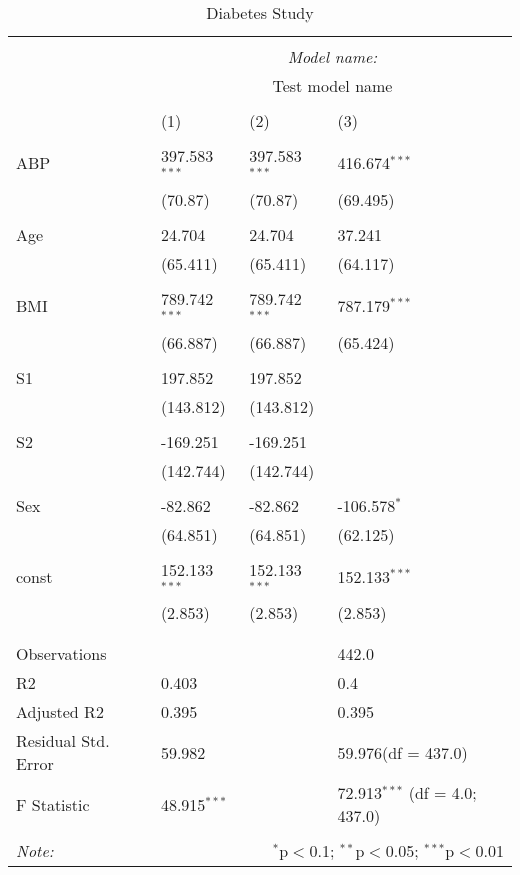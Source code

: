\documentclass[12pt]{article}
\numberwithin{equation}{subsection}
\begin{document}
\begin{table}[!htbp] \centering
  \caption{Diabetes Study}
  \label{}
\begin{tabularx}{\textwidth}{lXXX}
\\[-1.8ex]\hline
\hline \\[-1.8ex]
& \multicolumn{3}{c}{\textit{Model name:}} \
\cr \cline{3-4}
\\[-1.8ex] & \multicolumn{3}{c}{Test model name} \\\\[-1.8ex] & (1) & (2) & (3) \\
\hline \\[-1.8ex]
 ABP & 397.583$^{***}$ & 397.583$^{***}$ & 416.674$^{***}$ \\
  & (70.87) & (70.87) & (69.495) \\
  & & & \\
 Age & 24.704$^{}$ & 24.704$^{}$ & 37.241$^{}$ \\
  & (65.411) & (65.411) & (64.117) \\
  & & & \\
 BMI & 789.742$^{***}$ & 789.742$^{***}$ & 787.179$^{***}$ \\
  & (66.887) & (66.887) & (65.424) \\
  & & & \\
 S1 & 197.852$^{}$ & 197.852$^{}$ & \\
  & (143.812) & (143.812) & \\
  & & & \\
 S2 & -169.251$^{}$ & -169.251$^{}$ & \\
  & (142.744) & (142.744) & \\
  & & & \\
 Sex & -82.862$^{}$ & -82.862$^{}$ & -106.578$^{*}$ \\
  & (64.851) & (64.851) & (62.125) \\
  & & & \\
 const & 152.133$^{***}$ & 152.133$^{***}$ & 152.133$^{***}$ \\
  & (2.853) & (2.853) & (2.853) \\
  & & & \\
\hline \\[-1.8ex]
 Observations &   &   & 442.0 \\
 R${2}$ & 0.403 &   & 0.4 \\
 Adjusted R${2}$ & 0.395 &   & 0.395 \\
 Residual Std. Error & 59.982 &   & 59.976(df = 437.0)  \\
 F Statistic & 48.915$^{***}$  &     & 72.913$^{***}$ (df = 4.0; 437.0) \\
\hline
\hline \\[-1.8ex]
\textit{Note:} & \multicolumn{3}{r}{$^{*}$p$<$0.1; $^{**}$p$<$0.05; $^{***}$p$<$0.01} \\
\end{tabularx}
\end{table}
\end{document}
